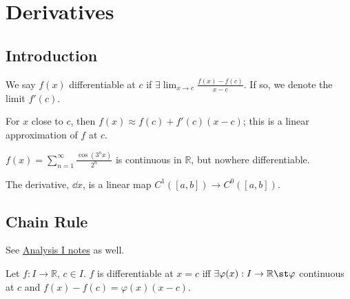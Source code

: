 \section{Derivatives}
\subsection{Introduction}

\begin{definition}[Differentiable]
    We say $f(x)$ differentiable at $c$ if $\exists \lim_{x \to c} \frac{f(x) - f(c)}{x-c}$. If so, we denote the limit $f'(c)$.
\end{definition}

\begin{remark}
    For $x$ close to $c$, then $f(x) \approx f(c) + f'(c)(x-c)$; this is a linear approximation of $f$ at $c$.
\end{remark}

\begin{example}[Weierstrass]
    $f(x) = \sum_{n=1}^\infty \frac{\cos(3^nx)}{2^n}$ is continuous in $\mathbb{R}$, but nowhere differentiable.
\end{example}
\begin{definition}
    The derivative, $\dd{x}$, is a linear map $C^1([a, b]) \to C^0([a, b])$.
\end{definition}

\subsection{Chain Rule}
\begin{remark}
    See \href{https://notes.louismeunier.net/Analysis%201/analysis.pdf#page=96}{Analysis I notes} as well.
\end{remark}
\begin{theorem}\label{thm:Caratheodory}
    Let $f: I \to \mathbb{R}$, $c \in I$. $f$ is differentiable at $x = c$ iff $\exists \varphi(x) : I \to \mathbb{R} \st \varphi$ continuous at $c$ and $f(x) - f(c) = \varphi(x)(x - c)$.\footnotemark
\end{theorem}


